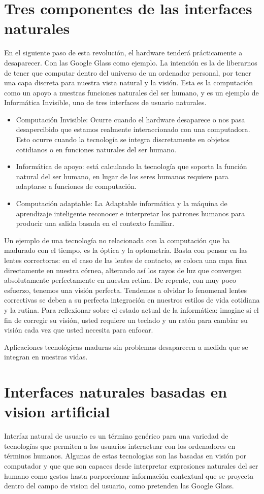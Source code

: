 \section{Tres componentes de las interfaces naturales}
En el siguiente paso de esta revolución, el hardware tenderá prácticamente a desaparecer. Con las Google Glass como ejemplo. La intención es la de liberarnos de tener que computar dentro del universo de un ordenador personal, por tener una capa discreta para nuestra vista natural y la visión. Esta es la computación como un apoyo a nuestras funciones naturales del ser humano, y es un ejemplo de Informática Invisible, uno de tres interfaces de usuario naturales.
\begin{itemize}
\item Computación Invisible: Ocurre cuando el hardware desaparece o nos pasa desapercibido que estamos realmente interaccionado con una computadora. Esto ocurre cuando la tecnología se integra discretamente en objetos cotidianos o en funciones naturales del ser humano.
\item Informática de apoyo:  está calculando la tecnología que soporta la función natural del ser humano, en lugar de los seres humanos requiere para adaptarse a funciones de computación.
\item Computación adaptable:  La Adaptable informática y la máquina de aprendizaje inteligente reconocer e interpretar los patrones humanos para producir una salida basada en el contexto familiar.
\end{itemize}

Un ejemplo de una tecnología no relacionada con la computación que ha madurado con el tiempo, es la óptica y la optometría. Basta con pensar en las lentes correctoras: en el caso de las lentes de contacto, se coloca una capa fina directamente en nuestra córnea, alterando así los rayos de luz que convergen absolutamente perfectamente en nuestra retina. De repente, con muy poco esfuerzo, tenemos una visión perfecta. Tendemos a olvidar lo fenomenal lentes correctivas se deben a su perfecta integración en nuestros estilos de vida cotidiana y la rutina. Para reflexionar sobre el estado actual de la informática: imagine si el fin de corregir su visión, usted requiere un teclado y un ratón para cambiar su visión cada vez que usted necesita para enfocar.

Aplicaciones tecnológicas maduras sin problemas desaparecen a medida que se integran en nuestras vidas.

\section{Interfaces naturales basadas en vision artificial}
Interfaz natural de usuario es un término genérico para una variedad de tecnologías que permiten a los usuarios interactuar con los ordenadores en términos humanos. Algunas de estas tecnologias son las basadas en visión por computador y que que son capaces desde interpretar expresiones naturales del ser humano como gestos hasta porporcionar información contextual que se proyecta dentro del campo de vision del usuario, como pretenden las Google Glass. 


